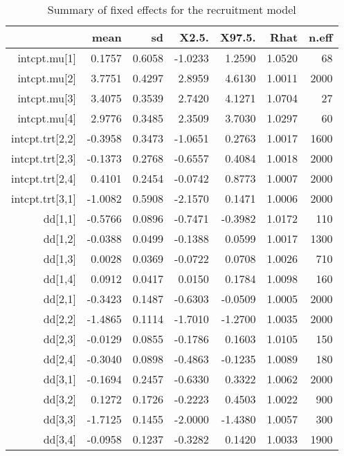 \begin{table}[ht]
\centering
\caption{Summary of fixed effects for the recruitment model} 
\label{table:recruitment}
\begin{tabular}{rrrrrrr}
  \hline
 & mean & sd & X2.5. & X97.5. & Rhat & n.eff \\ 
  \hline
intcpt.mu[1] & 0.1757 & 0.6058 & -1.0233 & 1.2590 & 1.0520 &    68 \\ 
  intcpt.mu[2] & 3.7751 & 0.4297 & 2.8959 & 4.6130 & 1.0011 &  2000 \\ 
  intcpt.mu[3] & 3.4075 & 0.3539 & 2.7420 & 4.1271 & 1.0704 &    27 \\ 
  intcpt.mu[4] & 2.9776 & 0.3485 & 2.3509 & 3.7030 & 1.0297 &    60 \\ 
  intcpt.trt[2,2] & -0.3958 & 0.3473 & -1.0651 & 0.2763 & 1.0017 &  1600 \\ 
  intcpt.trt[2,3] & -0.1373 & 0.2768 & -0.6557 & 0.4084 & 1.0018 &  2000 \\ 
  intcpt.trt[2,4] & 0.4101 & 0.2454 & -0.0742 & 0.8773 & 1.0007 &  2000 \\ 
  intcpt.trt[3,1] & -1.0082 & 0.5908 & -2.1570 & 0.1471 & 1.0006 &  2000 \\ 
  dd[1,1] & -0.5766 & 0.0896 & -0.7471 & -0.3982 & 1.0172 &   110 \\ 
  dd[1,2] & -0.0388 & 0.0499 & -0.1388 & 0.0599 & 1.0017 &  1300 \\ 
  dd[1,3] & 0.0028 & 0.0369 & -0.0722 & 0.0708 & 1.0026 &   710 \\ 
  dd[1,4] & 0.0912 & 0.0417 & 0.0150 & 0.1784 & 1.0098 &   160 \\ 
  dd[2,1] & -0.3423 & 0.1487 & -0.6303 & -0.0509 & 1.0005 &  2000 \\ 
  dd[2,2] & -1.4865 & 0.1114 & -1.7010 & -1.2700 & 1.0035 &  2000 \\ 
  dd[2,3] & -0.0129 & 0.0855 & -0.1786 & 0.1603 & 1.0105 &   150 \\ 
  dd[2,4] & -0.3040 & 0.0898 & -0.4863 & -0.1235 & 1.0089 &   180 \\ 
  dd[3,1] & -0.1694 & 0.2457 & -0.6330 & 0.3322 & 1.0062 &  2000 \\ 
  dd[3,2] & 0.1272 & 0.1726 & -0.2223 & 0.4503 & 1.0022 &   900 \\ 
  dd[3,3] & -1.7125 & 0.1455 & -2.0000 & -1.4380 & 1.0057 &   300 \\ 
  dd[3,4] & -0.0958 & 0.1237 & -0.3282 & 0.1420 & 1.0033 &  1900 \\ 

\end{tabular}
\end{table}
